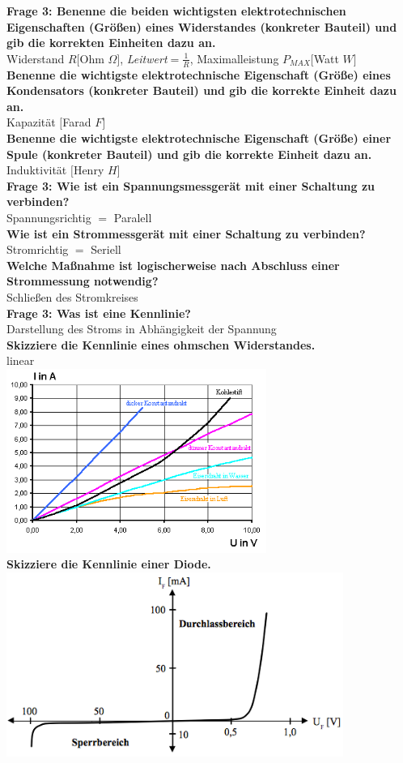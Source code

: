 \documentclass[11pt,a4paper]{scrartcl}
\begin{document}
\textbf{Frage 3: Benenne die beiden wichtigsten elektrotechnischen Eigenschaften (Größen) eines Widerstandes (konkreter Bauteil) und gib die korrekten Einheiten dazu an.}\\
Widerstand $R[$Ohm $\Omega]$, \textit{Leitwert}$=\frac{1}{R}$, Maximalleistung $P_{MAX}[$Watt $W]$\\
\textbf{Benenne die wichtigste elektrotechnische Eigenschaft (Größe) eines Kondensators (konkreter Bauteil) und gib die korrekte Einheit dazu an.}\\
Kapazität $[$Farad $F]$\\
\textbf{Benenne die wichtigste elektrotechnische Eigenschaft (Größe) einer Spule (konkreter Bauteil) und gib die korrekte Einheit dazu an.}\\
Induktivität $[$Henry $H]$\\
\textbf{Frage 3: Wie ist ein Spannungsmessgerät mit einer Schaltung zu verbinden?}\\
Spannungsrichtig $=$ Paralell\\
\textbf{Wie ist ein Strommessgerät mit einer Schaltung zu verbinden?}\\
Stromrichtig $=$ Seriell\\
\textbf{Welche Maßnahme ist logischerweise nach Abschluss einer Strommessung notwendig?}\\
Schließen des Stromkreises\\
\textbf{Frage 3: Was ist eine Kennlinie?}\\
Darstellung des Stroms in Abhängigkeit der Spannung\\
\textbf{Skizziere die Kennlinie eines ohmschen Widerstandes.}\\
linear\\
\includegraphics[height=6cm,keepaspectratio]{Kennlinie_Ohm.png}\\
\textbf{Skizziere die Kennlinie einer Diode.}\\
\includegraphics[height=6cm,keepaspectratio]{Kennlinie_Diode.png}\\
\end{document}
